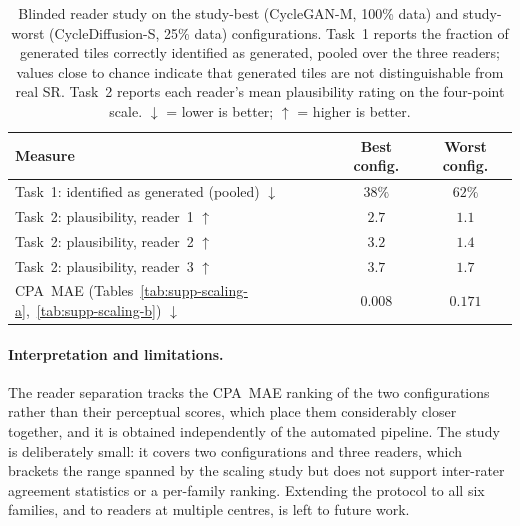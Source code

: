 \begin{table}[h!]
\centering
\caption{Blinded reader study on the study-best (CycleGAN-M, 100\% data) and study-worst
  (CycleDiffusion-S, 25\% data) configurations. Task~1 reports the fraction of generated
  tiles correctly identified as generated, pooled over the three readers; values close
  to chance indicate that generated tiles are not distinguishable from real SR. Task~2
  reports each reader's mean plausibility rating on the four-point scale.
  $\downarrow$ = lower is better; $\uparrow$ = higher is better.}
\label{tab:reader_study}
\small
\begin{tabular}{lcc}
\toprule
\textbf{Measure} & \textbf{Best config.} & \textbf{Worst config.} \\
\midrule
Task~1: identified as generated (pooled) $\downarrow$ & $38\%$ & $62\%$ \\
\midrule
Task~2: plausibility, reader~1 $\uparrow$ & $2.7$ & $1.1$ \\
Task~2: plausibility, reader~2 $\uparrow$ & $3.2$ & $1.4$ \\
Task~2: plausibility, reader~3 $\uparrow$ & $3.7$ & $1.7$ \\
\midrule
CPA~MAE (Tables~\ref{tab:supp-scaling-a},~\ref{tab:supp-scaling-b}) $\downarrow$ & $0.008$ & $0.171$ \\
\bottomrule
\end{tabular}
\end{table}

\paragraph{Interpretation and limitations.}
The reader separation tracks the CPA~MAE ranking of the two configurations rather than
their perceptual scores, which place them considerably closer together, and it is
obtained independently of the automated pipeline. The study is deliberately small: it
covers two configurations and three readers, which brackets the range spanned by the
scaling study but does not support inter-rater agreement statistics or a per-family
ranking. Extending the protocol to all six families, and to readers at multiple centres,
is left to future work.
